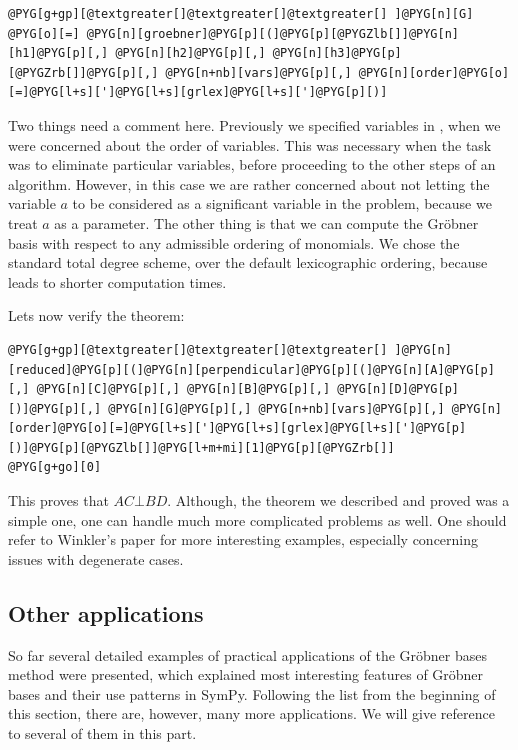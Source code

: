 \begin{Verbatim}[commandchars=@\[\]]
@PYG[g+gp][@textgreater[]@textgreater[]@textgreater[] ]@PYG[n][G] @PYG[o][=] @PYG[n][groebner]@PYG[p][(]@PYG[p][@PYGZlb[]]@PYG[n][h1]@PYG[p][,] @PYG[n][h2]@PYG[p][,] @PYG[n][h3]@PYG[p][@PYGZrb[]]@PYG[p][,] @PYG[n+nb][vars]@PYG[p][,] @PYG[n][order]@PYG[o][=]@PYG[l+s][']@PYG[l+s][grlex]@PYG[l+s][']@PYG[p][)]
\end{Verbatim}
\noindent
Two things need a comment here. Previously we specified variables in , when we were
concerned about the order of variables. This was necessary when the task was to eliminate particular
variables, before proceeding to the other steps of an algorithm. However, in this case we are rather
concerned about not letting the variable $a$ to be considered as a significant variable in the problem,
because we treat $a$ as a parameter. The other thing is that we can compute the Gröbner basis with
respect to any admissible ordering of monomials. We chose the standard total degree scheme, over the
default lexicographic ordering, because leads to shorter computation times.

Lets now verify the theorem:

\begin{Verbatim}[commandchars=@\[\]]
@PYG[g+gp][@textgreater[]@textgreater[]@textgreater[] ]@PYG[n][reduced]@PYG[p][(]@PYG[n][perpendicular]@PYG[p][(]@PYG[n][A]@PYG[p][,] @PYG[n][C]@PYG[p][,] @PYG[n][B]@PYG[p][,] @PYG[n][D]@PYG[p][)]@PYG[p][,] @PYG[n][G]@PYG[p][,] @PYG[n+nb][vars]@PYG[p][,] @PYG[n][order]@PYG[o][=]@PYG[l+s][']@PYG[l+s][grlex]@PYG[l+s][']@PYG[p][)]@PYG[p][@PYGZlb[]]@PYG[l+m+mi][1]@PYG[p][@PYGZrb[]]
@PYG[g+go][0]
\end{Verbatim}
\noindent
This proves that $AC \bot BD$. Although, the theorem we described and proved was a simple one, one can
handle much more complicated problems as well. One should refer to Winkler's paper for more interesting
examples, especially concerning issues with degenerate cases.


\subsection{Other applications}

So far several detailed examples of practical applications of the Gröbner bases method were
presented, which explained most interesting features of Gröbner bases and their use patterns
in SymPy. Following the list from the beginning of this section, there are, however, many more
applications. We will give reference to several of them in this part.

